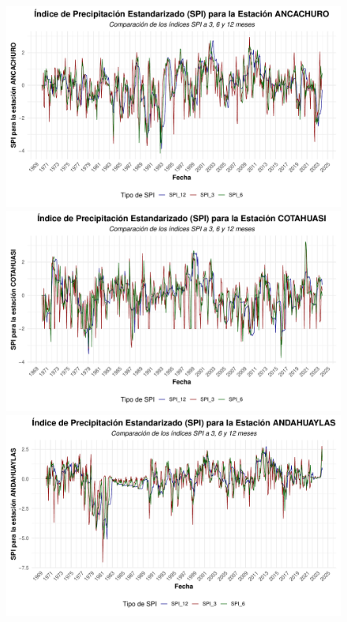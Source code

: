 \begin{landscape}  %

\begin{figure}[h!]
\centering
\begin{minipage}{0.45\textwidth}
    \centering
    \includegraphics[width=\linewidth]{Capitulos/spi/SPI_Station_ANCACHURO.pdf}
    
\end{minipage} \hfill
\begin{minipage}{0.45\textwidth}
    \centering
    \includegraphics[width=\linewidth]{Capitulos/spi/SPI_Station_COTAHUASI.pdf}
   
\end{minipage} \hfill
\begin{minipage}{0.45\textwidth}
    \centering
    \includegraphics[width=\linewidth]{Capitulos/spi/SPI_Station_ANDAHUAYLAS.pdf}
  

\end{minipage}
\end{figure}
\end{landscape}
